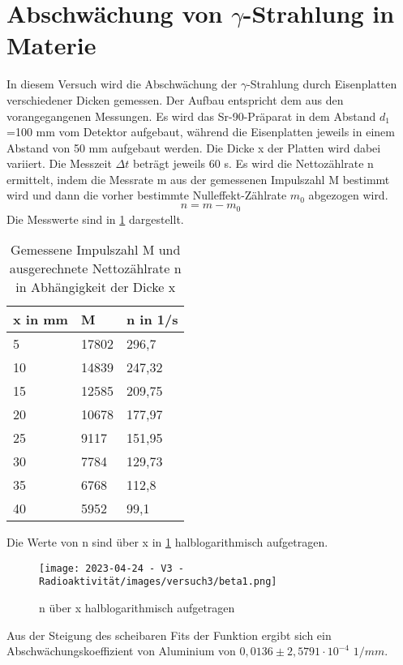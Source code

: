 \documentclass[../protokoll.tex]{subfiles}
\begin{document}
\section{Abschwächung von \texorpdfstring{$\gamma$}{Gamma}-Strahlung in Materie}\label{sec:Abschwächung Gamma-Strahlung}
In diesem Versuch wird die Abschwächung der $\gamma$-Strahlung durch Eisenplatten verschiedener Dicken gemessen. Der Aufbau entspricht dem aus den vorangegangenen Messungen. Es wird das Sr-90-Präparat in dem Abstand $d_1$=100 mm vom Detektor aufgebaut, während die Eisenplatten jeweils in einem Abstand von 50 mm aufgebaut werden. Die Dicke x der Platten wird dabei variiert. Die Messzeit $\Delta t$ beträgt jeweils 60 s. Es wird die Nettozählrate n ermittelt, indem die Messrate m aus der gemessenen Impulszahl M bestimmt wird und dann die vorher bestimmte Nulleffekt-Zählrate $m_0$ abgezogen wird.
\begin{equation}
        n=m-m_0
\end{equation}
Die Messwerte sind in \ref{tab3} dargestellt.
\begin{table}[h]
\centering
\begin{tabular}{|l|l|l|}
\hline
x in mm & M     & n in 1/s \\ \hline
5       & 17802 & 296,7    \\ \hline
10      & 14839 & 247,32   \\ \hline
15      & 12585 & 209,75   \\ \hline
20      & 10678 & 177,97   \\ \hline
25      & 9117  & 151,95   \\ \hline
30      & 7784  & 129,73   \\ \hline
35      & 6768  & 112,8    \\ \hline
40      & 5952  & 99,1     \\ \hline
\end{tabular}
\caption{Gemessene Impulszahl M und ausgerechnete Nettozählrate n in Abhängigkeit der Dicke x}
\label{tab3}
\end{table}
Die Werte von n sind über x in \ref{beta1} halblogarithmisch aufgetragen.
\begin{figure}
    \centering
    \texttt{[image: 2023-04-24 - V3 - Radioaktivität/images/versuch3/beta1.png]}
    \caption{n über x halblogarithmisch aufgetragen}
    \label{beta1}
\end{figure}
Aus der Steigung des scheibaren Fits der Funktion ergibt sich ein Abschwächungskoeffizient von Aluminium von $0,0136 \pm 2,5791 \cdot 10^{-4}$ $1/mm$.
\end{document}
